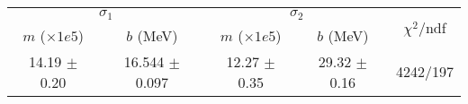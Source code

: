 \begin{tabular}{cc|cc||c}
\multicolumn{2}{c|}{$\sigma_1$} & \multicolumn{2}{|c}{$\sigma_2$}  & \multirow{2}{*}{$\chi^2/$ndf}\\
$m$ ($\times1e5$) & $b$ (MeV) & $m$ ($\times1e5$) & $b$ (MeV)  & \\
\hline
14.19 $\pm$ 0.20 & 16.544 $\pm$ 0.097 & 12.27 $\pm$ 0.35 & 29.32 $\pm$ 0.16 & 4242/197\\
\end{tabular}
